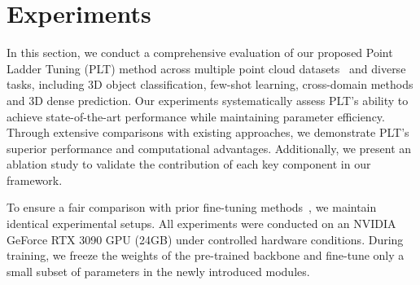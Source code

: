 

\section{Experiments}
\label{sec:experiments}


In this section, we conduct a comprehensive evaluation of our proposed Point Ladder Tuning (PLT) method across multiple point cloud datasets~\cite{wu20153d, uy2019revisiting, yi2016scalable, armeni20163d, dai2017scannet} and diverse tasks, including 3D object classification, few-shot learning, cross-domain methods and 3D dense prediction. Our experiments systematically assess PLT's ability to achieve state-of-the-art performance while maintaining parameter efficiency. Through extensive comparisons with existing approaches, we demonstrate PLT's superior performance and computational advantages. Additionally, we present an ablation study to validate the contribution of each key component in our framework.

To ensure a fair comparison with prior fine-tuning methods~\cite{zha2023instance, zhou2024dynamic}, we maintain identical experimental setups. All experiments were conducted on an NVIDIA GeForce RTX 3090 GPU (24GB) under controlled hardware conditions. During training, we freeze the weights of the pre-trained backbone and fine-tune only a small subset of parameters in the newly introduced modules.

